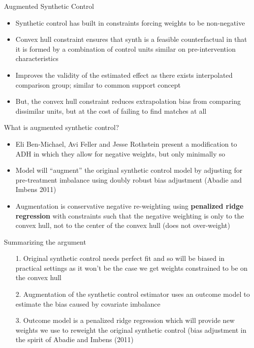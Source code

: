 \documentclass{beamer}
\begin{document}
\begin{frame}{Augmented Synthetic Control}
\begin{itemize}
\item Synthetic control has built in constraints forcing weights to be non-negative
\item Convex hull constraint ensures that synth is a feasible counterfactual in that it is formed by a combination of control units similar on pre-intervention characteristics
\item Improves the validity of the estimated effect as there exists interpolated comparison group; similar to common support concept
\item But, the convex hull constraint reduces extrapolation bias from comparing dissimilar units, but at the cost of failing to find matches at all
\end{itemize}

\end{frame}



\begin{frame}{What is augmented synthetic control?}

\begin{itemize}
\item Eli Ben-Michael, Avi Feller and Jesse Rothstein present a modification to ADH in which they allow for negative weights, but only minimally so
\item Model will ``augment'' the original synthetic control model by adjusting for pre-treatment imbalance using doubly robust bias adjustment (Abadie and Imbens 2011)
\item Augmentation is conservative negative re-weighting using \textbf{penalized ridge regression} with constraints such that the negative weighting is only to the convex hull, not to the center of the convex hull (does not over-weight)
\end{itemize}

\end{frame}




\begin{frame}{Summarizing the argument}

\begin{enumerate}
\item[1. ] Original synthetic control needs perfect fit and so will be biased in practical settings as it won't be the case we get weights constrained to be  on the convex hull
\item[2. ] Augmentation of the synthetic control estimator uses an outcome model to estimate the bias caused by covariate imbalance 
\item[3. ] Outcome model is a penalized ridge regression which will provide new weights we use to reweight the original synthetic control (bias adjustment in the spirit of Abadie and Imbens (2011)
\end{enumerate}

\end{frame}
\end{document}
